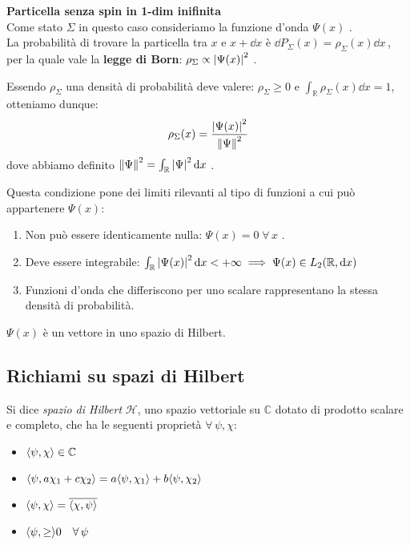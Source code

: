 \begin{example}
    \textbf{Particella senza spin in 1-dim inifinita}\\
    Come stato \(\Sigma\) in questo caso consideriamo la funzione d'onda \(\Psi(x)\) . \\
    La probabilità di trovare la particella tra  \(x\)  e  \(x+\dd{x}\)  è  \(\dd{P_\Sigma}(x)= \rho_\Sigma(x)\dd{x}\,\), 
    per la quale vale la \textbf{legge di Born}: \(\rho_\Sigma\propto \abs{\Psi(x)}^2\) .

    Essendo \(\rho_\Sigma\) una densità di probabilità deve valere: \(\rho_\Sigma \geq 0 \) e \(\int_\mathbb{R} \rho_\Sigma(x) \dd{x}= 1\), otteniamo dunque:
    \begin{equation}
        \rho_\Sigma(x) = \frac{\abs{\Psi(x)}^2}{\norm{\Psi}^2} 
    \end{equation}
    dove abbiamo definito \(\norm{\Psi}^2 = \int_\mathbb{R}\abs{\Psi}^2 \dd{x}\) .

    Questa condizione pone dei limiti rilevanti al tipo di funzioni a cui può appartenere \(\Psi(x)\):
    \begin{enumerate}
        \item Non può essere identicamente nulla: \(\Psi(x)= 0 \;\forall \, x\) .
        \item Deve essere integrabile: \(\int_\mathbb{R} \abs{\Psi(x)}^2 \dd{x} < + \infty \implies \Psi(x) \in L_2(\mathbb{R}, \dd{x})\)
        \item Funzioni d'onda che differiscono per uno scalare rappresentano la stessa densità di probabilità.
    \end{enumerate}
    
    \begin{remark}
        \(\Psi(x)\) è un vettore in uno spazio di Hilbert.
    \end{remark}
\end{example}


\subsection{Richiami su spazi di Hilbert}
Si dice \textit{spazio di Hilbert} \(\mathcal{H}\), uno spazio vettoriale su \(\mathbb{C}\) dotato di prodotto scalare e completo, 
che ha le seguenti proprietà \(\forall \,\psi,\chi\):
\begin{itemize}
    \item \( \langle \psi, \chi \rangle \in \mathbb{C}\)
    \item \(\langle \psi, a\chi_1+c\chi_2 \rangle= a\langle \psi, \chi_1 \rangle+b\langle \psi, \chi_2 \rangle\)
    \item \(\langle \psi, \chi \rangle= \overline{\langle \chi, \psi \rangle}\)
    \item \(\langle \psi, \geq \rangle 0\quad \forall \,\psi\)
\end{itemize}

